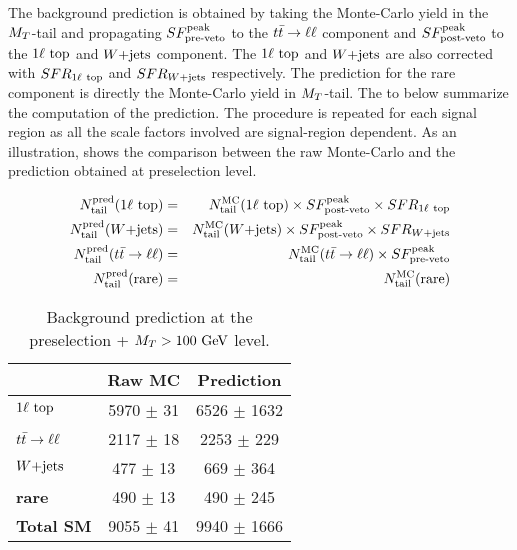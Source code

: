        The background prediction is obtained by taking the Monte-Carlo yield in the
        $M_T$-tail and propagating $SF_{\text{pre-veto}}^{\text{peak}}$ to the $t\bar{t} \rightarrow \ell \ell$ component and $SF_{\text{post-veto}}^{\text{peak}}$
        to the $1\ell~\text{top}$ and $\text{$W$+jets}$ component. The $1\ell~\text{top}$ and $\text{$W$+jets}$
        are also corrected with $SFR_{1\ell~\text{top}}$ and $SFR_{\text{$W$+jets}}$ respectively. The
        prediction for the rare component is directly the Monte-Carlo yield in $M_T$-tail.
        The  to  below summarize
        the computation of the prediction. The procedure is repeated for each signal
        region as all the scale factors involved are signal-region dependent. As an
        illustration,  shows the comparison between
        the raw Monte-Carlo and the prediction obtained at preselection level.

        \begin{eqnarray}
            N^\text{pred}_\text{tail}(1\ell~\text{top}) & = & N^\text{MC}_\text{tail}(1\ell~\text{top})  \times SF_{\text{post-veto}}^{\text{peak}} \times SFR_{1\ell~\text{top}} \label{eq:prediction1ltop}  \\
            N^\text{pred}_\text{tail}(\text{$W$+jets})        & = & N^\text{MC}_\text{tail}(\text{$W$+jets})         \times SF_{\text{post-veto}}^{\text{peak}}  \times SFR_{\text{$W$+jets}}                             \\
            N^\text{pred}_\text{tail}(t\bar{t} \rightarrow \ell \ell)  & = & N^\text{MC}_\text{tail}(t\bar{t} \rightarrow \ell \ell)   \times SF_{\text{pre-veto}}^{\text{peak}}                                                \\
            N^\text{pred}_\text{tail}(\text{rare})   & = & N^\text{MC}_\text{tail}(\text{rare})                                           \label{eq:predictionrare}
        \end{eqnarray}

        \begin{table}[!ht]
            \begin{center}
                \begin{tabular}{|l|c|c|}
                    \hline
                                             &  \textbf{Raw MC}    & \textbf{Prediction}       \\
                    \hline
                    \textbf{$1\ell~\text{top}$} &  5970 $\pm$ 31      & 6526 $\pm$ 1632     \\
                    \textbf{$t\bar{t} \rightarrow \ell \ell$}  &  2117 $\pm$ 18      & 2253 $\pm$  229     \\
                    \textbf{$\text{$W$+jets}$}        &   477 $\pm$ 13      &  669 $\pm$  364     \\
                    \textbf{rare}            &   490 $\pm$ 13      &  490 $\pm$  245     \\
                    \hline
                    \textbf{Total SM}        &  9055 $\pm$ 41      & 9940 $\pm$ 1666     \\
                    \hline
                \end{tabular}
                \caption{ Background prediction at the preselection + $M_T > 100~\text{GeV}$ level.}
                \label{tab:predictionPreselection}
            \end{center}
        \end{table}

